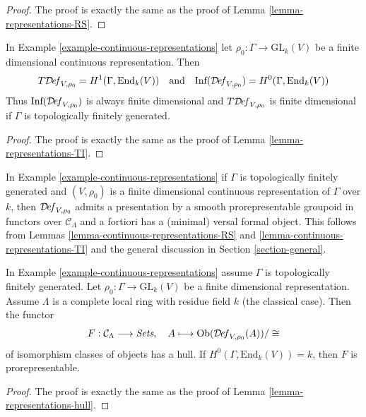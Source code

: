 \begin{proof}
The proof is exactly the same as the proof of
Lemma \ref{lemma-representations-RS}.
\end{proof}

\begin{lemma}
\label{lemma-continuous-representations-TI}
In Example \ref{example-continuous-representations} let
$\rho_0 : \Gamma \to \text{GL}_k(V)$ be a finite dimensional
continuous representation. Then
$$
T\mathcal{D}\!\mathit{ef}_{V, \rho_0} = H^1(\Gamma, \text{End}_k(V))
\quad\text{and}\quad
\text{Inf}(\mathcal{D}\!\mathit{ef}_{V, \rho_0}) = H^0(\Gamma, \text{End}_k(V))
$$
Thus $\text{Inf}(\mathcal{D}\!\mathit{ef}_{V, \rho_0})$
is always finite dimensional
and $T\mathcal{D}\!\mathit{ef}_{V, \rho_0}$ is finite dimensional
if $\Gamma$ is topologically finitely generated.
\end{lemma}

\begin{proof}
The proof is exactly the same as the proof of
Lemma \ref{lemma-representations-TI}.
\end{proof}

\noindent
In Example \ref{example-continuous-representations} if $\Gamma$
is topologically finitely generated
and $(V, \rho_0)$ is a finite dimensional continuous representation of $\Gamma$
over $k$, then $\mathcal{D}\!\mathit{ef}_{V, \rho_0}$
admits a presentation by a smooth prorepresentable groupoid in functors
over $\mathcal{C}_\Lambda$
and a fortiori has a (minimal) versal formal object. This follows
from Lemmas \ref{lemma-continuous-representations-RS} and
\ref{lemma-continuous-representations-TI}
and the general discussion in Section \ref{section-general}.

\begin{lemma}
\label{lemma-continuous-representations-hull}
In Example \ref{example-continuous-representations} assume $\Gamma$
is topologically finitely generated.
Let $\rho_0 : \Gamma \to \text{GL}_k(V)$ be a finite dimensional representation.
Assume $\Lambda$ is a complete local ring with residue field $k$
(the classical case). Then the functor
$$
F : \mathcal{C}_\Lambda \longrightarrow \textit{Sets},\quad
A \longmapsto \mathop{\mathrm{Ob}}\nolimits(\mathcal{D}\!\mathit{ef}_{V, \rho_0}(A))/\cong
$$
of isomorphism classes of objects has a hull. If
$H^0(\Gamma, \text{End}_k(V)) = k$, then $F$ is
prorepresentable.
\end{lemma}

\begin{proof}
The proof is exactly the same as the proof of
Lemma \ref{lemma-representations-hull}.
\end{proof}



